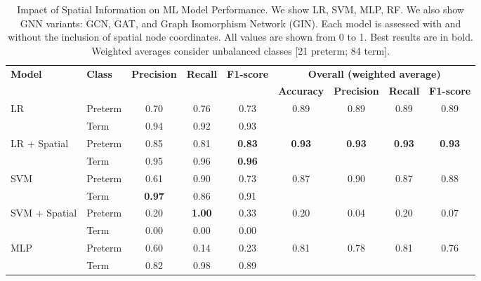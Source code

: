 \documentclass[doubleblind]{ecai}
\begin{document}
\begin{table}[h]
    \centering    
    \caption{Impact of Spatial Information on ML Model Performance. We show LR, SVM, MLP, RF. We also show GNN variants: GCN, GAT, and Graph Isomorphism Network (GIN). Each model is assessed with and without the inclusion of spatial node coordinates. All values are shown from 0 to 1. Best results are in bold. Weighted averages consider unbalanced classes [21 preterm; 84 term].}
    \vspace{0.1cm}

    \begin{tabular}{ll|ccc|cccc}
        \hline
        \textbf{Model} & \textbf{Class} & \textbf{Precision} & \textbf{Recall} & \textbf{F1-score}
            & \multicolumn{4}{c}{\textbf{Overall (weighted average)}} \\
        & & & & & \textbf{Accuracy} & \textbf{Precision} & \textbf{Recall} & \textbf{F1-score} \\
        \hline
        \multirow{2}{*}{LR} 
            & Preterm & 0.70& 0.76& 0.73& \multirow{2}{*}{0.89}& \multirow{2}{*}{0.89}& \multirow{2}{*}{0.89}& \multirow{2}{*}{0.89}\\
            & Term    & 0.94& 0.92& 0.93&  &  &  &  \\
        \hline
        \multirow{2}{*}{LR + Spatial} 
            & Preterm    & 0.85& 0.81& \textbf{0.83}& \multirow{2}{*}{\textbf{0.93}}& \multirow{2}{*}{\textbf{0.93}}& \multirow{2}{*}{\textbf{0.93}}& \multirow{2}{*}{\textbf{0.93}}\\
            & Term       & 0.95& 0.96& \textbf{0.96}&  &  &  &  \\
        \hline
        \multirow{2}{*}{SVM} 
            & Preterm & 0.61& 0.90& 0.73& \multirow{2}{*}{0.87}& \multirow{2}{*}{0.90}& \multirow{2}{*}{0.87}& \multirow{2}{*}{0.88}\\
            & Term    & \textbf{0.97}& 0.86& 0.91&  &  &  &  \\
        \hline
        \multirow{2}{*}{SVM + Spatial} 
            & Preterm & 0.20& \textbf{1.00}& 0.33& \multirow{2}{*}{0.20}& \multirow{2}{*}{0.04}& \multirow{2}{*}{0.20}& \multirow{2}{*}{0.07}\\
            & Term    & 0.00& 0.00& 0.00&  &  &  &  \\
        \hline
        \multirow{2}{*}{MLP} 
            & Preterm & 0.60& 0.14& 0.23& \multirow{2}{*}{0.81}& \multirow{2}{*}{0.78}& \multirow{2}{*}{0.81}& \multirow{2}{*}{0.76}\\
            & Term    & 0.82& 0.98& 0.89&  &  &  &  \\

\end{tabular}
\end{table}
\end{document}
